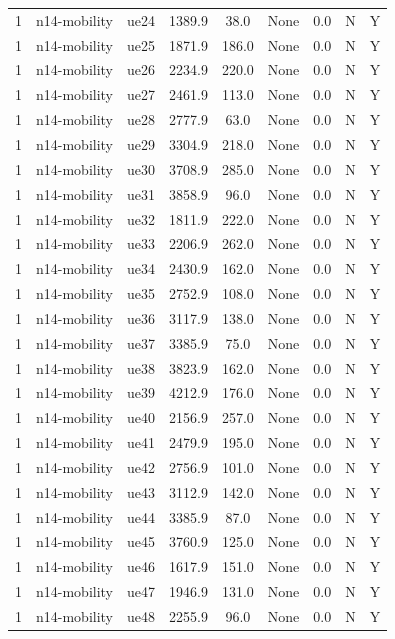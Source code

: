 \begin{table}[ht]
\begin{tabular}{|c|c|c|c|c|c|c|c|c|}
1 & n14-mobility & ue24 & 1389.9 & 38.0 & None & 0.0 & N & Y \\
1 & n14-mobility & ue25 & 1871.9 & 186.0 & None & 0.0 & N & Y \\
1 & n14-mobility & ue26 & 2234.9 & 220.0 & None & 0.0 & N & Y \\
1 & n14-mobility & ue27 & 2461.9 & 113.0 & None & 0.0 & N & Y \\
1 & n14-mobility & ue28 & 2777.9 & 63.0 & None & 0.0 & N & Y \\
1 & n14-mobility & ue29 & 3304.9 & 218.0 & None & 0.0 & N & Y \\
1 & n14-mobility & ue30 & 3708.9 & 285.0 & None & 0.0 & N & Y \\
1 & n14-mobility & ue31 & 3858.9 & 96.0 & None & 0.0 & N & Y \\
1 & n14-mobility & ue32 & 1811.9 & 222.0 & None & 0.0 & N & Y \\
1 & n14-mobility & ue33 & 2206.9 & 262.0 & None & 0.0 & N & Y \\
1 & n14-mobility & ue34 & 2430.9 & 162.0 & None & 0.0 & N & Y \\
1 & n14-mobility & ue35 & 2752.9 & 108.0 & None & 0.0 & N & Y \\
1 & n14-mobility & ue36 & 3117.9 & 138.0 & None & 0.0 & N & Y \\
1 & n14-mobility & ue37 & 3385.9 & 75.0 & None & 0.0 & N & Y \\
1 & n14-mobility & ue38 & 3823.9 & 162.0 & None & 0.0 & N & Y \\
1 & n14-mobility & ue39 & 4212.9 & 176.0 & None & 0.0 & N & Y \\
1 & n14-mobility & ue40 & 2156.9 & 257.0 & None & 0.0 & N & Y \\
1 & n14-mobility & ue41 & 2479.9 & 195.0 & None & 0.0 & N & Y \\
1 & n14-mobility & ue42 & 2756.9 & 101.0 & None & 0.0 & N & Y \\
1 & n14-mobility & ue43 & 3112.9 & 142.0 & None & 0.0 & N & Y \\
1 & n14-mobility & ue44 & 3385.9 & 87.0 & None & 0.0 & N & Y \\
1 & n14-mobility & ue45 & 3760.9 & 125.0 & None & 0.0 & N & Y \\
1 & n14-mobility & ue46 & 1617.9 & 151.0 & None & 0.0 & N & Y \\
1 & n14-mobility & ue47 & 1946.9 & 131.0 & None & 0.0 & N & Y \\
1 & n14-mobility & ue48 & 2255.9 & 96.0 & None & 0.0 & N & Y \\

\end{tabular}
\end{table}
